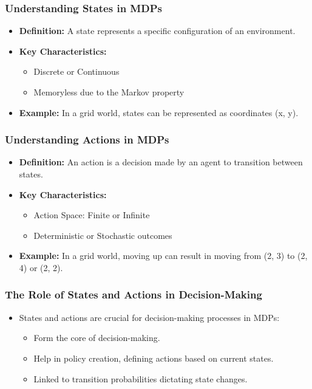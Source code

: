 \documentclass[aspectratio=169]{beamer}
\begin{document}
\begin{frame}[fragile]
    \frametitle{Understanding States in MDPs}
    \begin{itemize}
        \item \textbf{Definition:} A state represents a specific configuration of an environment.
        \item \textbf{Key Characteristics:}
            \begin{itemize}
                \item Discrete or Continuous
                \item Memoryless due to the Markov property
            \end{itemize}
        \item \textbf{Example:} In a grid world, states can be represented as coordinates (x, y).
    \end{itemize}
\end{frame}

\begin{frame}[fragile]
    \frametitle{Understanding Actions in MDPs}
    \begin{itemize}
        \item \textbf{Definition:} An action is a decision made by an agent to transition between states.
        \item \textbf{Key Characteristics:}
            \begin{itemize}
                \item Action Space: Finite or Infinite
                \item Deterministic or Stochastic outcomes
            \end{itemize}
        \item \textbf{Example:} In a grid world, moving up can result in moving from (2, 3) to (2, 4) or (2, 2).
    \end{itemize}
\end{frame}

\begin{frame}[fragile]
    \frametitle{The Role of States and Actions in Decision-Making}
    \begin{itemize}
        \item States and actions are crucial for decision-making processes in MDPs:
        \begin{itemize}
            \item Form the core of decision-making.
            \item Help in policy creation, defining actions based on current states.
            \item Linked to transition probabilities dictating state changes.
        \end{itemize}
    \end{itemize}
\end{frame}
\end{document}
